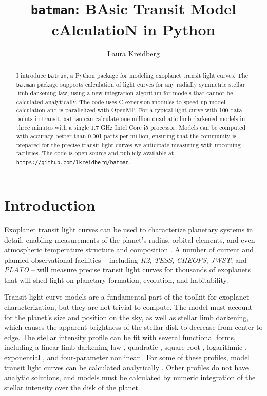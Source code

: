 \documentclass[12pt,preprint]{aastex}
\newcommand*{\blue}{\textcolor{blue}}
\begin{document}
\title{\texttt{batman}: BAsic Transit Model cAlculatioN in Python} 

\author{Laura Kreidberg}



\begin{abstract}
I introduce \texttt{batman}, a Python package for modeling exoplanet transit light curves.  The \texttt{batman} package supports calculation of light curves for any radially symmetric stellar limb darkening law, using a new integration algorithm for models that cannot be calculated analytically.  The code uses C extension modules to speed up model calculation and is parallelized with OpenMP.  For a typical light curve with 100 data points in transit, \texttt{batman} can calculate one million quadratic limb-darkened models in three minutes with a single 1.7 GHz Intel Core i5 processor.  Models can be computed with accuracy better than 0.001 parts per million, ensuring that the community is prepared for the precise transit light curves we anticipate measuring with upcoming facilities.  The code is open source and publicly available at \texttt{\blue{\url{https://github.com/lkreidberg/batman}}}.
\end{abstract}


\section{Introduction}
Exoplanet transit light curves can be used to characterize planetary systems in detail, enabling measurements of the planet's radius, orbital elements, and even atmospheric temperature structure and composition \citep{seager00, seager03}.  A number of current and planned observational facilities -- including \emph{K2}, \emph{TESS}, \emph{CHEOPS}, \emph{JWST}, and \emph{PLATO} -- will measure precise transit light curves for thousands of exoplanets that will shed light on planetary formation, evolution, and habitability.

Transit light curve models are a fundamental part of the toolkit for exoplanet characterization, but they are not trivial to compute.  The model must account for the planet's size and position on the sky, as well as stellar limb darkening, which causes the apparent brightness of the stellar disk to decrease from center to edge.  The  stellar intensity profile can be fit with several functional forms, including a linear limb darkening law \citep{schwarzschild06}, quadratic \citep{kopal50}, square-root \citep{diaz-cordoves92}, logarithmic \citep{klinglesmith70}, exponential \citep{claret03}, and four-parameter nonlinear \citep{claret00}.  For some of these profiles, model transit light curves can be calculated analytically \citep{mandel02, gimenez06, abubekerov13}.  Other profiles do not have analytic solutions, and models must be calculated by numeric integration of the stellar intensity over the disk of the planet. 
\end{document}
